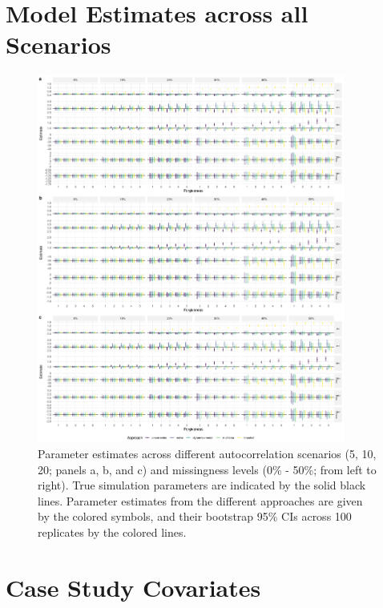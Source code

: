 \documentclass[../FinalThesis.tex]{subfiles}
\begin{document}
\section{Model Estimates across all Scenarios}
\begin{figure}[!ht]
  \begin{center}
  \includegraphics[width = 0.9\textwidth]{Figures/ModelComparisonAppendix.png}
  \caption{Parameter estimates across different autocorrelation scenarios (5,
  10, 20; panels a, b, and c) and missingness levels (0\% - 50\%; from left
  to right). True simulation parameters are indicated by the solid black
  lines. Parameter estimates from the different approaches are given by the
  colored symbols, and their bootstrap 95\% CIs across 100 replicates
  by the colored lines.}
  \label{ModelComparison}
  \end{center}
\end{figure}

\newpage
\section{Case Study Covariates}
\end{document}
